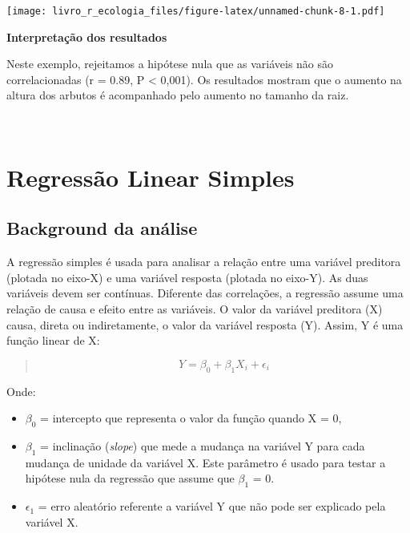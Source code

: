 \documentclass[
]{book}
\begin{document}
\texttt{[image: livro\_r\_ecologia\_files/figure-latex/unnamed-chunk-8-1.pdf]}

\textbf{Interpretação dos resultados}

Neste exemplo, rejeitamos a hipótese nula que as variáveis não são correlacionadas (r = 0.89, P \textless{} 0,001). Os resultados mostram que o aumento na altura dos arbutos é acompanhado pelo aumento no tamanho da raiz.

~

\hypertarget{regressuxe3o-linear-simples}{%
\section{Regressão Linear Simples}\label{regressuxe3o-linear-simples}}

\hypertarget{background-da-anuxe1lise-3}{%
\subsection{Background da análise}\label{background-da-anuxe1lise-3}}

A regressão simples é usada para analisar a relação entre uma variável preditora (plotada no eixo-X) e uma variável resposta (plotada no eixo-Y). As duas variáveis devem ser contínuas. Diferente das correlações, a regressão assume uma relação de causa e efeito entre as variáveis. O valor da variável preditora (X) causa, direta ou indiretamente, o valor da variável resposta (Y). Assim, Y é uma função linear de X:

\begin{quote}
\[ Y = \beta_0 + \beta_{1}X_i + \epsilon_i \]
\end{quote}

Onde:

\begin{itemize}
\item
  \(\beta_0\) = intercepto que representa o valor da função quando X = 0,
\item
  \(\beta_{1}\) = inclinação (\emph{slope}) que mede a mudança na variável Y para cada mudança de unidade da variável X. Este parâmetro é usado para testar a hipótese nula da regressão que assume que \(\beta_{1}\) = 0.
\item
  \(\epsilon_{1}\) = erro aleatório referente a variável Y que não pode ser explicado pela variável X.
\end{itemize}
\end{document}
